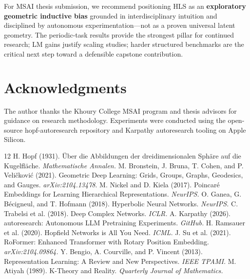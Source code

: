 \documentclass[11pt,twocolumn]{article}
\begin{document}
For MSAI thesis submission, we recommend positioning HLS as an \textbf{exploratory geometric inductive bias} grounded in interdisciplinary intuition and disciplined by autonomous experimentation---not as a proven universal latent geometry. The periodic-task results provide the strongest pillar for continued research; LM gains justify scaling studies; harder structured benchmarks are the critical next step toward a defensible capstone contribution.

\section*{Acknowledgments}

The author thanks the Khoury College MSAI program and thesis advisors for guidance on research methodology. Experiments were conducted using the open-source hopf-autoresearch repository and Karpathy autoresearch tooling on Apple Silicon.

\begin{thebibliography}{12}
 H. Hopf (1931). \"Uber die Abbildungen der dreidimensionalen Sph\"are auf die Kugelfl\"ache. \textit{Mathematische Annalen.}
 M. Bronstein, J. Bruna, T. Cohen, and P. Veli\v{c}kovi\'c (2021). Geometric Deep Learning: Grids, Groups, Graphs, Geodesics, and Gauges. \textit{arXiv:2104.13478}.
 M. Nickel and D. Kiela (2017). Poincar\'e Embeddings for Learning Hierarchical Representations. \textit{NeurIPS.}
 O. Ganea, G. B\'ecigneul, and T. Hofmann (2018). Hyperbolic Neural Networks. \textit{NeurIPS.}
 C. Trabelsi et al. (2018). Deep Complex Networks. \textit{ICLR.}
 A. Karpathy (2026). autoresearch: Autonomous LLM Pretraining Experiments. \textit{GitHub.}
 H. Ramsauer et al. (2020). Hopfield Networks is All You Need. \textit{ICML.}
 J. Su et al. (2021). RoFormer: Enhanced Transformer with Rotary Position Embedding. \textit{arXiv:2104.09864.}
 Y. Bengio, A. Courville, and P. Vincent (2013). Representation Learning: A Review and New Perspectives. \textit{IEEE TPAMI.}
 M. Atiyah (1989). K-Theory and Reality. \textit{Quarterly Journal of Mathematics.}
\end{thebibliography}
\end{document}
